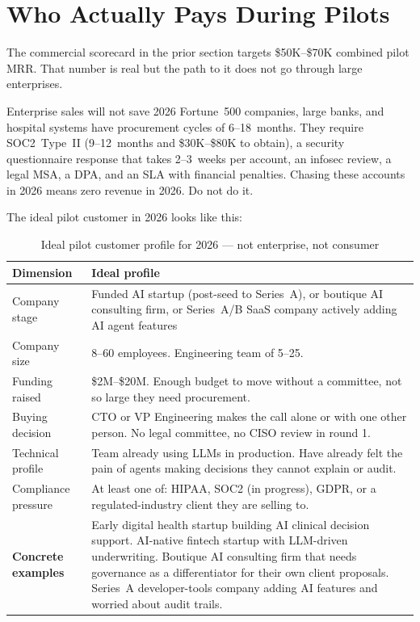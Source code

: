 \section*{Who Actually Pays During Pilots}

The commercial scorecard in the prior section targets \$50K--\$70K combined
pilot MRR. That number is real but the path to it does not go through
large enterprises.

\begin{warnbox}{Enterprise sales will not save 2026}
Fortune~500 companies, large banks, and hospital systems have procurement
cycles of 6--18~months. They require SOC2~Type~II (9--12~months and
\$30K--\$80K to obtain), a security questionnaire response that takes
2--3~weeks per account, an infosec review, a legal MSA, a DPA, and an SLA
with financial penalties. Chasing these accounts in 2026 means zero revenue
in 2026. Do not do it.
\end{warnbox}

\noindent The ideal pilot customer in 2026 looks like this:

\begin{table}[H]
\centering
\renewcommand{\arraystretch}{1.5}
\begin{tabularx}{\textwidth}{@{}lX@{}}
\toprule
\textbf{Dimension} & \textbf{Ideal profile} \\
\midrule
Company stage & Funded AI startup (post-seed to Series~A), or boutique AI
               consulting firm, or Series~A/B SaaS company actively adding
               AI agent features \\
Company size  & 8--60 employees. Engineering team of 5--25. \\
Funding raised & \$2M--\$20M. Enough budget to move without a committee, not
                 so large they need procurement. \\
Buying decision & CTO or VP Engineering makes the call alone or with one other
                 person. No legal committee, no CISO review in round 1. \\
Technical profile & Team already using LLMs in production. Have already felt
                   the pain of agents making decisions they cannot explain or
                   audit. \\
Compliance pressure & At least one of: HIPAA, SOC2 (in progress), GDPR, or
                      a regulated-industry client they are selling to. \\
\midrule
\textbf{Concrete examples} & Early digital health startup building AI clinical
  decision support. AI-native fintech startup with LLM-driven underwriting.
  Boutique AI consulting firm that needs governance as a differentiator for
  their own client proposals. Series~A developer-tools company adding
  AI features and worried about audit trails. \\
\bottomrule
\end{tabularx}
\caption{Ideal pilot customer profile for 2026 --- not enterprise, not consumer}
\end{table}


